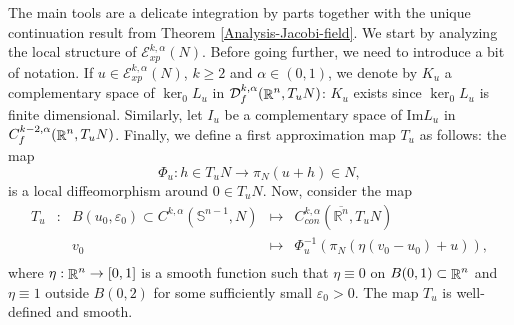 \documentclass[a4paper,11pt,reqno]{amsart}
\def\R{\mathop{\rm \mathbb{R}}\nolimits}
\newcommand{\Ent}{\mathcal{E}}
\newcommand{\Ima}{\text{Im}}
\begin{document}
The main tools are a delicate integration by parts together with the unique continuation result from Theorem \ref{Analysis-Jacobi-field}. We start by analyzing  the local structure of $\Ent_{xp}^{k,\alpha}(N)$. Before going further, we need to introduce a bit of notation. If $u\in\Ent_{xp}^{k,\alpha}(N)$, $k\geq 2$ and $\alpha\in(0,1)$, we denote by $K_u$ a complementary space of $\ker_0L_u$ in $\mathcal{D}_f^{k,\alpha}(\R^n,T_uN)$: $K_u$ exists since $\ker_0L_u$ is finite dimensional. Similarly, let $I_u$ be a complementary space of $\Ima L_u$ in $C_f^{k-2,\alpha}(\R^n,T_uN)$. Finally, we define a first approximation map $T_u$ as follows: the map $$\Phi_u:h\in T_uN\rightarrow \pi_N(u+h)\in N,$$ is a local diffeomorphism around $0\in T_uN$. Now, consider the map
$$\begin{array}{ccccc}
T_u & : & B(u_0,\varepsilon_0)\subset C^{k,\alpha}(\mathbb{S}^{n-1},N) & \mapsto & C_{con}^{k,\alpha}(\overline{\mathbb{R}^n},T_uN) \\
 & & v_0 & \mapsto & \Phi^{-1}_{u}(\pi_N(\eta(v_0-u_0)+u)), \\
\end{array}$$
where $\eta :\R^n\rightarrow [0,1]$ is a smooth function such that $\eta\equiv 0$ on $B(0,1)\subset \R^n$ and $\eta\equiv 1$ outside $B(0,2)$ for some sufficiently small $\varepsilon_0>0$. The map $T_u$ is well-defined and smooth. 

\end{document}

